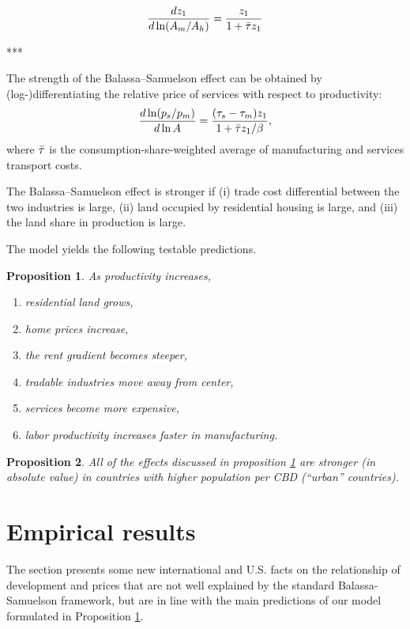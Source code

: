 \documentclass[12pt]{article}
\newtheorem{proposition}{Proposition}
\begin{document}
\[
 \frac{d z_1}{d\ln(A_m/A_h)} = \frac{z_1}{1+\Bar\tau z_1}
\]

***



The strength of the Balassa--Samuelson effect can be obtained by (log-)differentiating the relative price of services with respect to productivity:
\begin{equation}\label{eq:bscs}
\frac{d\ln (p_s/p_m)}{d\ln A} = \frac{(\tau_s-\tau_m)z_1}{1+\Bar\tau z_1/\beta},
\end{equation}
where $\Bar\tau$ is the consumption-share-weighted average of manufacturing and services transport costs.

The Balassa--Samuelson effect is stronger if (i) trade cost differential between the two industries is large, (ii) land occupied by residential housing is large, and (iii) the land share in production is large.

The model yields the following testable predictions.
\begin{proposition}\label{prop:compstat}
As productivity increases,
\begin{enumerate}
    \item residential land grows,
    \item home prices increase,
    \item the rent gradient becomes steeper,
    \item tradable industries move away from center,
    \item services become more expensive,
    \item labor productivity increases faster in manufacturing.
\end{enumerate}
\end{proposition}
\begin{proposition}
All of the effects discussed in proposition \ref{prop:compstat} are stronger (in absolute value) in countries with higher population per CBD (``urban'' countries).
\end{proposition}



\section{Empirical results}\label{empirics}
The section presents some new international and U.S. facts on the relationship of development and prices that are not well explained by the standard Balassa-Samuelson framework, but are in line with the main predictions of our model formulated in Proposition \ref{prop:compstat}.
\end{document}
